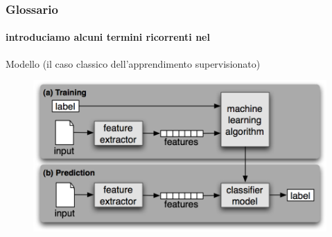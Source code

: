 \begin{frame}

	\frametitle{Glossario}
	\framesubtitle{introduciamo alcuni termini ricorrenti nel \ml}

	\begin{block}{Modello (il caso classico dell'apprendimento supervisionato)}
		\begin{figure}[!htbp]
			\centering
			\includegraphics[width=11.2cm]{images/glossary/supervised_learning_2.png}
			\label{fig:glossary_supervised_learning_2}
		\end{figure}

	\end{block}

\end{frame}


